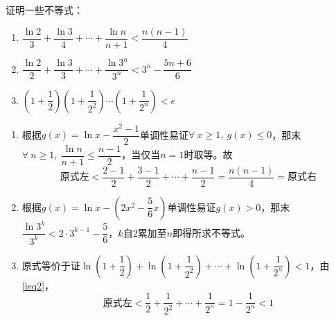 \begin{que}
	证明一些不等式：\begin{enumerate}
		\item $\dfrac{\ln 2}{3}+\dfrac{\ln 3}{4}+\cdots+\dfrac{\ln n}{n+1}<\dfrac{n(n-1)}{4}$
		\item $\dfrac{\ln 2}{2}+\dfrac{\ln 3}{3}+\cdots+\dfrac{\ln 3^n}{3^n}<3^n-\dfrac{5n+6}{6}$
		\item $\left(1+\dfrac{1}{2}\right)\left(1+\dfrac{1}{2^2}\right)\cdots\left(1+\dfrac{1}{2^n}\right)<e$
	\end{enumerate}
\end{que}
\sol \begin{enumerate}
	\item 根据$g(x)=\ln x-\dfrac{x^2-1}{2}$单调性易证$\forall\ x\geqslant 1,\ g(x)\leqslant 0$，那末$\forall\ n\geqslant 1,\ \dfrac{\ln n}{n+1}\leqslant \dfrac{n-1}{2}$，当仅当$n=1$时取等。故$$\text{原式左}<\dfrac{2-1}{2}+\dfrac{3-1}{2}+\cdots+\dfrac{n-1}{2}=\dfrac{n(n-1)}{4}=\text{原式右}$$
	\item 根据$g(x)=\ln x-\left(2x^2-\dfrac{5}{6}x\right)$单调性易证$g(x)>0$，那末$\dfrac{\ln 3^k}{3^k}<2\cdot 3^{k-1}-\dfrac{5}{6}$，$k$自$2$累加至$n$即得所求不等式。
	\item 原式等价于证$\ln\left(1+\dfrac{1}{2}\right)+\ln\left(1+\dfrac{1}{2^2}\right)+\cdots+\ln\left(1+\dfrac{1}{2^n}\right)<1$，由\ref{ieq2}，$$\text{原式左}<\dfrac{1}{2}+\dfrac{1}{2^2}+\cdots+\dfrac{1}{2^n}=1-\dfrac{1}{2^n}<1$$
\end{enumerate}\par\hfill{}\easy\par

